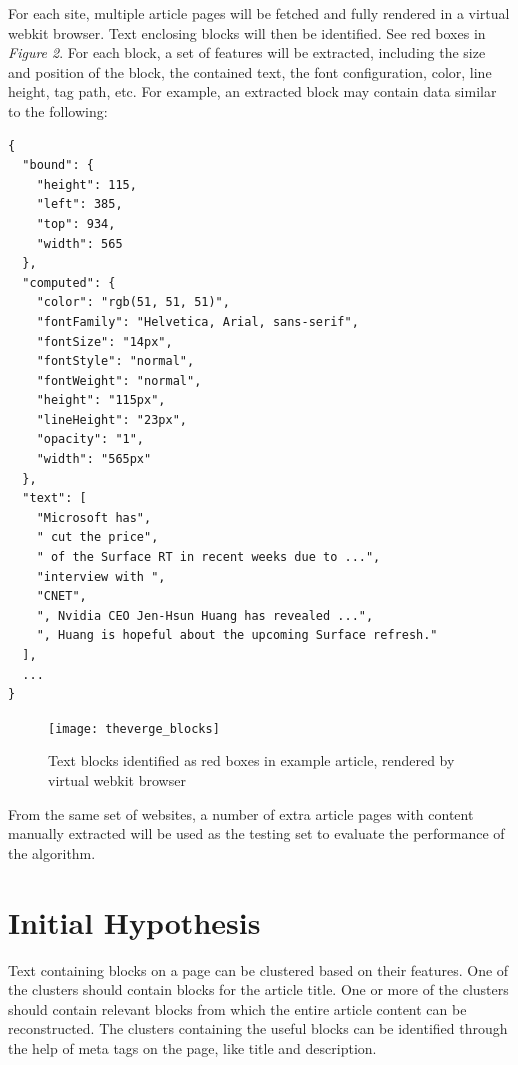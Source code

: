 \documentclass[a4paper,10pt]{article}
\begin{document}
For each site, multiple article pages will be fetched and fully rendered in a virtual webkit browser. Text enclosing blocks will then be identified. See red boxes in \emph{Figure 2}. For each block, a set of features will be extracted, including the size and position of the block, the contained text, the font configuration, color, line height, tag path, etc. For example, an extracted block may contain data similar to the following:

\begin{verbatim}
{
  "bound": {
    "height": 115,
    "left": 385,
    "top": 934,
    "width": 565
  },
  "computed": {
    "color": "rgb(51, 51, 51)",
    "fontFamily": "Helvetica, Arial, sans-serif",
    "fontSize": "14px",
    "fontStyle": "normal",
    "fontWeight": "normal",
    "height": "115px",
    "lineHeight": "23px",
    "opacity": "1",
    "width": "565px"
  },
  "text": [
    "Microsoft has",
    " cut the price",
    " of the Surface RT in recent weeks due to ...",
    "interview with ",
    "CNET",
    ", Nvidia CEO Jen-Hsun Huang has revealed ...",
    ", Huang is hopeful about the upcoming Surface refresh."
  ],
  ...
}
\end{verbatim}

\begin{figure}[htp]
\centering
\texttt{[image: theverge\_blocks]}
\caption{Text blocks identified as red boxes in example article, rendered by virtual webkit browser}
\label{}
\end{figure}

From the same set of websites, a number of extra article pages with content manually extracted will be used as the testing set to evaluate the performance of the algorithm.


\section{Initial Hypothesis}

Text containing blocks on a page can be clustered based on their features. One of the clusters should contain blocks for the article title. One or more of the clusters should contain relevant blocks from which the entire article content can be reconstructed. The clusters containing the useful blocks can be identified through the help of meta tags on the page, like title and description.
\end{document}
